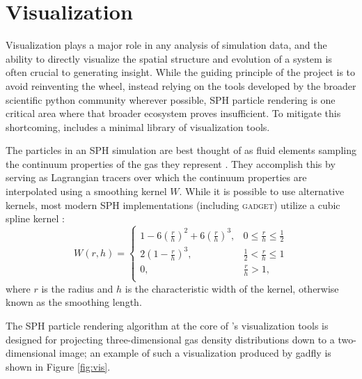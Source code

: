 \section{Visualization}
\label{sec:vis}
Visualization plays a major role in any analysis of simulation data, and the ability to directly visualize the spatial structure and evolution of a system is often crucial to generating insight.
While the guiding principle of the  project is to avoid reinventing the wheel, instead relying on the tools developed by the broader scientific python community wherever possible, SPH particle rendering is one critical area where that broader ecosystem proves insufficient.  
To mitigate this shortcoming,  includes a minimal library of visualization tools.

The particles in an SPH simulation are best thought of as fluid elements sampling the continuum properties of the gas they represent \citep{Lucy1977,GingoldMonaghan1977,Monaghan1992,Springel2010}.  They accomplish this by serving as Lagrangian tracers over which the continuum properties are interpolated using a smoothing kernel $W$. While it is possible to use alternative kernels, most modern SPH implementations (including \textsc{gadget}) utilize a cubic spline kernel \citep{Springel2014}: 
\begin{equation}
W(r,h) =
     \begin{cases}
       1 - 6 \left( \frac{r}{h} \right)^2 + 6 \left( \frac{r}{h} \right)^3, & 0 \leq \frac{r}{h} \leq \frac{1}{2}\\
       2 \left(1 - \frac{r}{h}\right)^3, & \frac{1}{2} < \frac{r}{h} \leq 1\\
       0, & \frac{r}{h} >  1,\\
     \end{cases}
\end{equation}
where $r$ is the radius and $h$ is the characteristic width of the kernel, otherwise known as the smoothing length.

The SPH particle rendering algorithm at the core of 's visualization tools is designed for projecting three-dimensional gas density distributions down to a two-dimensional image; an example of such a visualization produced by gadfly is shown in Figure \ref{fig:vis}.


